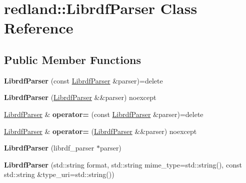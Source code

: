\hypertarget{classredland_1_1LibrdfParser}{}\section{redland\+:\+:Librdf\+Parser Class Reference}
\label{classredland_1_1LibrdfParser}
\subsection*{Public Member Functions}
\begin{DoxyCompactItemize}
\item 
\mbox{\label{classredland_1_1LibrdfParser_a884b4e7cb05942390fba7765cfb3aec8}} 
{\bfseries Librdf\+Parser} (const \hyperlink{classredland_1_1LibrdfParser}{Librdf\+Parser} \&parser)=delete
\item 
\mbox{\label{classredland_1_1LibrdfParser_a8c75ee321bd82076491aa0d63d0664c8}} 
{\bfseries Librdf\+Parser} (\hyperlink{classredland_1_1LibrdfParser}{Librdf\+Parser} \&\&parser) noexcept
\item 
\mbox{\label{classredland_1_1LibrdfParser_aeee1312383f2e3f72e49076390a2a27b}} 
\hyperlink{classredland_1_1LibrdfParser}{Librdf\+Parser} \& {\bfseries operator=} (const \hyperlink{classredland_1_1LibrdfParser}{Librdf\+Parser} \&parser)=delete
\item 
\mbox{\label{classredland_1_1LibrdfParser_a5a5e09075b43906c9161d453ac63ab8a}} 
\hyperlink{classredland_1_1LibrdfParser}{Librdf\+Parser} \& {\bfseries operator=} (\hyperlink{classredland_1_1LibrdfParser}{Librdf\+Parser} \&\&parser) noexcept
\item 
\mbox{\label{classredland_1_1LibrdfParser_ac1373b22444c108a2a67dbf24fa4ca92}} 
{\bfseries Librdf\+Parser} (librdf\+\_\+parser $\ast$parser)
\item 
\mbox{\label{classredland_1_1LibrdfParser_ac594c85ec97a39cad1aa557c98c39eb1}} 
{\bfseries Librdf\+Parser} (std\+::string format, std\+::string mime\+\_\+type=std\+::string(), const std\+::string \&type\+\_\+uri=std\+::string())
\item 

\end{DoxyCompactItemize}
